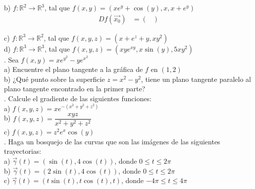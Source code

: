 \documentclass[letterpaper]{article}
\renewcommand{\*}{\cdot}
\theoremstyle{definition}
\begin{document}
\noindent b) $f: \mathbb{R}^2  \longrightarrow \mathbb{R}^3$, tal que $f(x,y) = (xe^y + \cos(y), x, x + e^y)$\\

\begin{align*}
	Df(\vec{x_0}) &= \begin{pmatrix}
	
	\end{pmatrix}
\end{align*}

\noindent c) $f: \mathbb{R}^3  \longrightarrow \mathbb{R}^2$, tal que $f(x,y,z) = (x + e^z + y, xy^2)$\\

\noindent d) $f: \mathbb{R}^3  \longrightarrow \mathbb{R}^3$, tal que $f(x,y,z) = (xye^{xy}, x\sin(y), 5xy^2)$\\



.  Sea $f(x,y) = xe^{y^2} - ye^{x^2}$\\


\noindent a) Encuentre el plano tangente a la gráfica de $f$ en $(1, 2)$\\

\noindent b) ¿Qué punto sobre la superficie $z = x^2 -y^2$, tiene un plano tangente paralelo al plano tangente encontrado en la primer parte?\\


.  Calcule el gradiente de las siguientes funciones:\\


\noindent a) $f(x,y,z) = x e^{-(x^2 +y^2 +z^2)}$\\

\noindent b) $f(x,y,z) = \dfrac{xyz}{x^2 +y^2 +z^2}$\\

\noindent c) $f(x,y,z) = z^2e^x\cos(y)$\\



. Haga un bosquejo de las curvas que son las imágenes de las siguientes trayectorias:\\


\noindent a) $\vec{\gamma}(t) = (\sin(t), 4\cos(t))$, donde $0 \leq t \leq 2\pi$\\

\noindent b) $\vec{\gamma}(t) = (2\sin(t), 4\cos(t))$, donde $0 \leq t \leq 2\pi$\\

\noindent c) $\vec{\gamma}(t) = (t\sin(t), t\cos(t), t)$, donde $ -4\pi \leq t \leq 4\pi$\\
\end{document}
